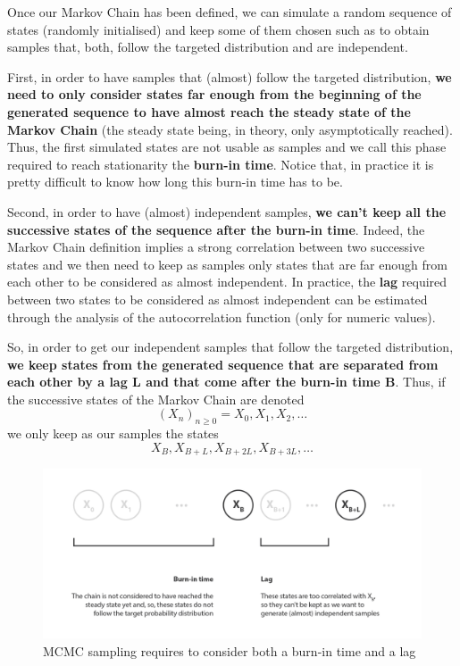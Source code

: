 Once our Markov Chain has been defined, we can simulate a random sequence of states (randomly initialised) and keep some of them chosen such as to obtain samples that, both, follow the targeted distribution and are independent.

First, in order to have samples that (almost) follow the targeted distribution, \textbf{we need to only consider states far enough from the beginning of the generated sequence to have almost reach the steady state of the Markov Chain} (the steady state being, in theory, only asymptotically reached). Thus, the first simulated states are not usable as samples and we call this phase required to reach stationarity the \textbf{burn-in time}. Notice that, in practice it is pretty difficult to know how long this burn-in time has to be.

Second, in order to have (almost) independent samples, \textbf{we can't keep all the successive states of the sequence after the burn-in time}. Indeed, the Markov Chain definition implies a strong correlation between two successive states and we then need to keep as samples only states that are far enough from each other to be considered as almost independent. In practice, the \textbf{lag} required between two states to be considered as almost independent can be estimated through the analysis of the autocorrelation function (only for numeric values).

So, in order to get our independent samples that follow the targeted distribution, \textbf{we keep states from the generated sequence that are separated from each other by a lag L and that come after the burn-in time B}. Thus, if the successive states of the Markov Chain are denoted
\begin{equation}\left(X_{n}\right)_{n \geq 0}=X_{0}, X_{1}, X_{2}, \dots\end{equation}
we only keep as our samples the states
\begin{equation}X_{B}, X_{B+L}, X_{B+2 L}, X_{B+3 L}, \dots\end{equation}

\begin{figure}[h]
    \centering
\includegraphics[width=\textwidth]{pic/p05c07-snip05.png}
    \caption{MCMC sampling requires to consider both a burn-in time and a lag}
    \label{fig:p05c07-snip05}
\end{figure}



